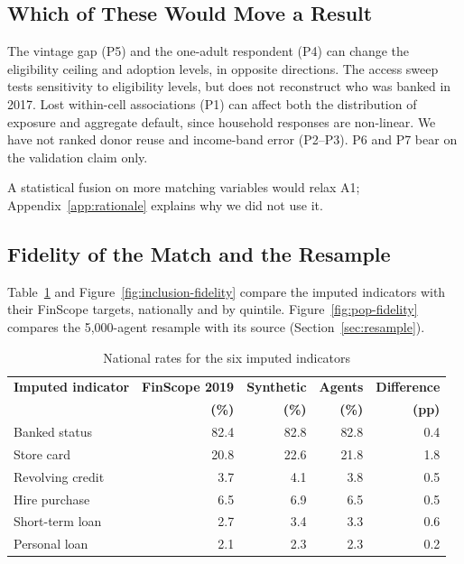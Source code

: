 \subsection{Which of These Would Move a Result}\label{app:match-results}

The vintage gap (P5) and the one-adult respondent (P4) can change the eligibility ceiling and
adoption levels, in opposite directions.
The access sweep tests sensitivity to eligibility levels, but does not reconstruct who was banked
in 2017. Lost within-cell associations (P1) can affect both the distribution of exposure and
aggregate default, since household responses are non-linear.
We have not ranked donor reuse and income-band error (P2--P3). P6 and P7 bear on the validation
claim only.

A statistical fusion on more matching variables would relax A1; Appendix~\ref{app:rationale}
explains why we did not use it.

\subsection{Fidelity of the Match and the Resample}\label{app:match-fidelity}

Table~\ref{tab:imputation_errors} and Figure~\ref{fig:inclusion-fidelity} compare the imputed
indicators with their \ac{FinScope} targets, nationally and by quintile.
Figure~\ref{fig:pop-fidelity} compares the 5{,}000-agent resample with its source
(Section~\ref{sec:resample}).

\begin{table}[!htbp]
\centering
\caption{National rates for the six imputed indicators}
\label{tab:imputation_errors}
\small
\begin{tabular}{lrrrr}
\toprule
\textbf{Imputed indicator} & \textbf{FinScope 2019} & \textbf{Synthetic} & \textbf{Agents} & \textbf{Difference} \\
 & \textbf{(\%)} & \textbf{(\%)} & \textbf{(\%)} & \textbf{(pp)} \\
\midrule
Banked status    & 82.4 & 82.8 & 82.8 & 0.4 \\
Store card       & 20.8 & 22.6 & 21.8 & 1.8 \\
Revolving credit &  3.7 &  4.1 &  3.8 & 0.5 \\
Hire purchase    &  6.5 &  6.9 &  6.5 & 0.5 \\
Short-term loan  &  2.7 &  3.4 &  3.3 & 0.6 \\
Personal loan    &  2.1 &  2.3 &  2.3 & 0.2 \\
\bottomrule
\end{tabular}
\end{table}


